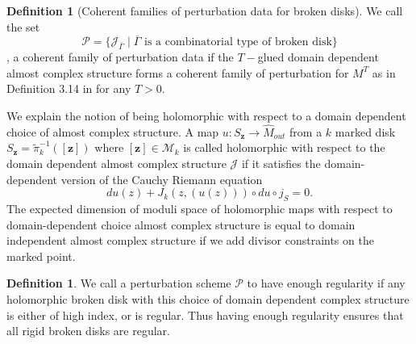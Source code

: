 \documentclass[11pt, oneside,dvipsnames]{amsart}
\newcommand{\of}{\circ}
\renewcommand{\to}{\rightarrow}
\newcommand{\inv}{^{-1}}
\newcommand{\wt}{\widetilde}
\renewcommand{\to}{\rightarrow}
\newcommand{\<}{\langle}
\renewcommand{\>}{\rangle}
\newcommand{\M}{\mathcal{M}}
\newcommand{\cP}{\mathcal{P}}
\renewcommand{\to}{\rightarrow}
\theoremstyle{definition}
\theoremstyle{definition}
\newtheorem{defn}[Theorem]{Definition}
\numberwithin{equation}{subsection}
\begin{document}
\begin{defn}[Coherent families of perturbation data for broken disks]
We call the set $$\mathcal{P} = \{ \mathcal{J}_{\overline{\Gamma}} \mid \overline{\Gamma} \text{ is a combinatorial type of broken disk} \}$$, a coherent family of perturbation data if the $T-$glued domain dependent almost complex structure forms a coherent family of perturbation for $M^T$ as in Definition 3.14 in \cite{cwstab} for any $T>0$.

\end{defn}



We explain the notion of being holomorphic with respect to a domain dependent choice of almost complex structure.  A map $u:S_{\textbf{z}} \to \widehat M_{out}$  from a $k$ marked disk $S_{\textbf{z}} = \wt \pi_k \inv ([\textbf{z}]) $ where $[\textbf{z}] \in \M_k$ is called  holomorphic with respect to the domain dependent almost complex structure $\mathcal{J}$ if it satisfies the domain-dependent version of the Cauchy Riemann equation 
\begin{equation*}
   du(z) + J_k(z,(u(z)))\of du \of j_S = 0 .
\end{equation*}
The expected dimension of moduli space of holomorphic maps with respect to domain-dependent choice almost complex structure is equal to domain independent almost complex structure if we add divisor constraints on the marked point. 



\begin{defn}
    We call a perturbation scheme $\cP$ to have enough regularity if any holomorphic broken disk with this choice of domain dependent complex structure is either of high index, or is regular. Thus having enough regularity ensures that all rigid broken disks are regular.
\end{defn}
\end{document}

